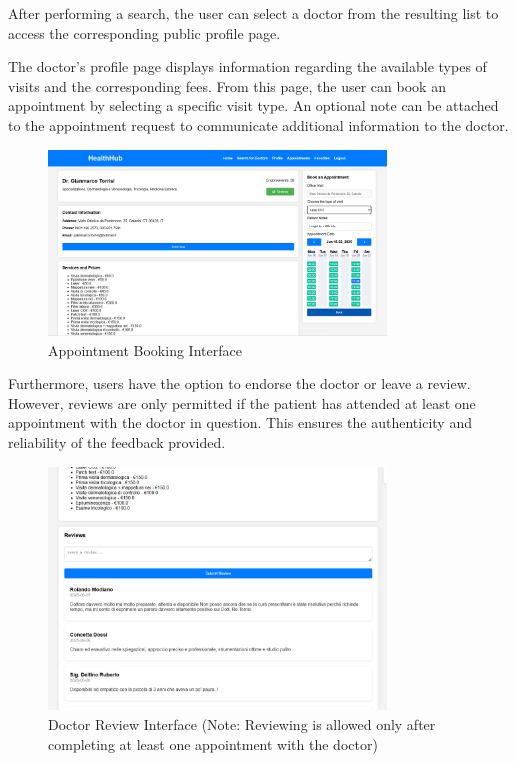 After performing a search, the user can select a doctor from the resulting list to access the corresponding public profile page.

The doctor's profile page displays information regarding the available types of visits and the corresponding fees. From this page, the user can book an appointment by selecting a specific visit type. An optional note can be attached to the appointment request to communicate additional information to the doctor.

\begin{figure}[H]
	\centering
	\includegraphics[width=0.8\textwidth]{resources/book-appointment.png}
	\caption{Appointment Booking Interface}
	\label{fig:book-appointment}
\end{figure}

Furthermore, users have the option to endorse the doctor or leave a review. However, reviews are only permitted if the patient has attended at least one appointment with the doctor in question. This ensures the authenticity and reliability of the feedback provided.

\begin{figure}[H]
	\centering
	\includegraphics[width=0.8\textwidth]{resources/review-doctor.png}
	\caption{Doctor Review Interface (Note: Reviewing is allowed only after completing at least one appointment with the doctor)}
	\label{fig:review-doctor}
\end{figure}

